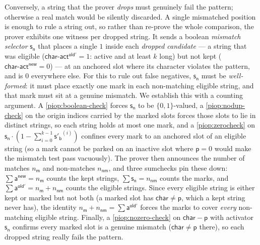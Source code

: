  Conversely, a string that the prover \emph{drops} must genuinely fail the pattern; otherwise a real match would be silently discarded. A single mismatched position is enough to rule a string out, so rather than re-prove the whole comparison, the prover exhibits one witness per dropped string. It sends a boolean \emph{mismatch selector} $\mathsf{s_n}$ that places a single $1$ inside each \emph{dropped candidate} --- a string that was eligible ($\mathsf{char\text{-}act^{old'}}=1$: active and at least $k$ long) but not kept ($\mathsf{char\text{-}act^{new}}=0$) --- at an anchored slot where its character violates the pattern, and is $0$ everywhere else. For this to rule out false negatives, $\mathsf{s_n}$ must be \emph{well-formed}: it must place exactly one mark in each non-matching eligible string, and that mark must sit at a genuine mismatch. We establish this with a counting argument. A \cref{piop:boolean-check} forces $\mathsf{s_n}$ to be $\{0,1\}$-valued, a \cref{piop:nodup-check} on the origin indices carried by the marked slots forces those slots to lie in distinct strings, so each string holds at most one mark, and a \cref{piop:zerocheck} on $\mathsf{s_n}\cdot(1-\sum_{i=0}^{k-1}\mathsf{s'_b}^{(i)})$ confines every mark to an anchored slot of an eligible string (so a mark cannot be parked on an inactive slot where $\mathsf{p}=0$ would make the mismatch test pass vacuously). The prover then announces the number of matches $n_{\mathsf{m}}$ and non-matches $n_{\mathsf{nm}}$, and three sumchecks pin these down: $\sum\mathsf{a^{new}} = n_{\mathsf{m}}$ counts the kept strings, $\sum\mathsf{s_n} = n_{\mathsf{nm}}$ counts the marks, and $\sum\mathsf{a^{old'}} = n_{\mathsf{m}}+n_{\mathsf{nm}}$ counts the eligible strings. Since every eligible string is either kept or marked but not both (a marked slot has $\mathsf{char}\neq\mathsf{p}$, which a kept string never has), the identity $n_{\mathsf{m}}+n_{\mathsf{nm}}=\sum\mathsf{a^{old'}}$ forces the marks to cover \emph{every} non-matching eligible string. Finally, a \cref{piop:nozero-check} on $\mathsf{char}-\mathsf{p}$ with activator $\mathsf{s_n}$ confirms every marked slot is a genuine mismatch ($\mathsf{char}\neq\mathsf{p}$ there), so each dropped string really fails the pattern.

